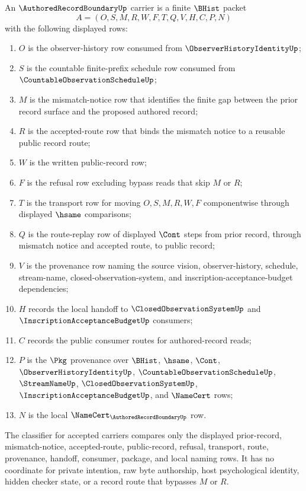 \begin{definition}
\label{def:authored-record-boundary-carrier}
An $\AuthoredRecordBoundaryUp$ carrier is a finite $\BHist$ packet
$$
A=(O,S,M,R,W,F,T,Q,V,H,C,P,N)
$$
with the following displayed rows:
\begin{enumerate}
\item $O$ is the observer-history row consumed from $\ObserverHistoryIdentityUp$;
\item $S$ is the countable finite-prefix schedule row consumed from $\CountableObservationScheduleUp$;
\item $M$ is the mismatch-notice row that identifies the finite gap between the prior record surface and the proposed authored record;
\item $R$ is the accepted-route row that binds the mismatch notice to a reusable public record route;
\item $W$ is the written public-record row;
\item $F$ is the refusal row excluding bypass reads that skip $M$ or $R$;
\item $T$ is the transport row for moving $O,S,M,R,W,F$ componentwise through displayed $\hsame$ comparisons;
\item $Q$ is the route-replay row of displayed $\Cont$ steps from prior record, through mismatch notice and accepted route, to public record;
\item $V$ is the provenance row naming the source vision, observer-history, schedule, stream-name, closed-observation-system, and inscription-acceptance-budget dependencies;
\item $H$ records the local handoff to $\ClosedObservationSystemUp$ and $\InscriptionAcceptanceBudgetUp$ consumers;
\item $C$ records the public consumer routes for authored-record reads;
\item $P$ is the $\Pkg$ provenance over $\BHist$, $\hsame$, $\Cont$, $\ObserverHistoryIdentityUp$, $\CountableObservationScheduleUp$, $\StreamNameUp$, $\ClosedObservationSystemUp$, $\InscriptionAcceptanceBudgetUp$, and $\NameCert$ rows;
\item $N$ is the local $\NameCert_{\AuthoredRecordBoundaryUp}$ row.
\end{enumerate}
The classifier for accepted carriers compares only the displayed prior-record, mismatch-notice, accepted-route, public-record, refusal, transport, route, provenance, handoff, consumer, package, and local naming rows. It has no coordinate for private intention, raw byte authorship, host psychological identity, hidden checker state, or a record route that bypasses $M$ or $R$.
\end{definition}

